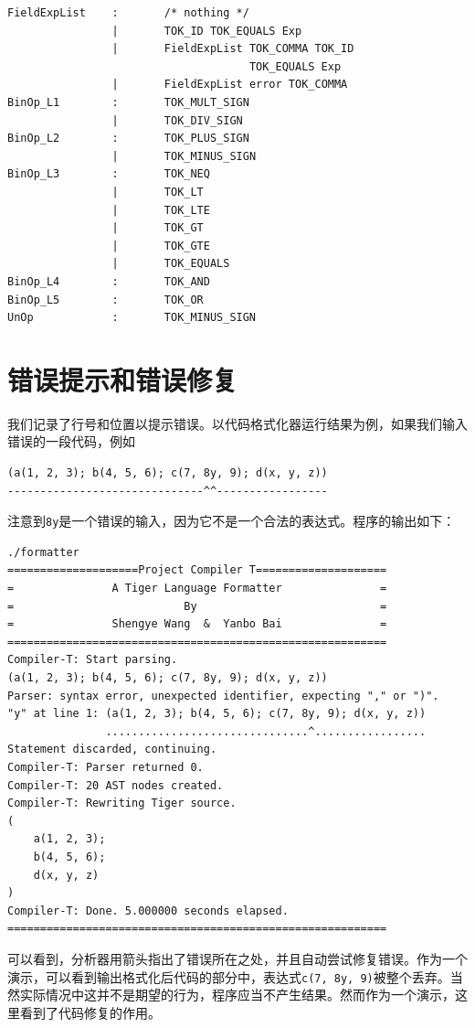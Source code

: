 \begin{verbatim}
FieldExpList    :       /* nothing */
                |       TOK_ID TOK_EQUALS Exp
                |       FieldExpList TOK_COMMA TOK_ID
                                     TOK_EQUALS Exp
                |       FieldExpList error TOK_COMMA
BinOp_L1        :       TOK_MULT_SIGN
                |       TOK_DIV_SIGN
BinOp_L2        :       TOK_PLUS_SIGN
                |       TOK_MINUS_SIGN
BinOp_L3        :       TOK_NEQ
                |       TOK_LT
                |       TOK_LTE
                |       TOK_GT
                |       TOK_GTE
                |       TOK_EQUALS
BinOp_L4        :       TOK_AND
BinOp_L5        :       TOK_OR
UnOp            :       TOK_MINUS_SIGN
\end{verbatim}

\section{错误提示和错误修复}

我们记录了行号和位置以提示错误。以代码格式化器运行结果为例，如果我们输入错误的一段代码，例如
\begin{verbatim}
(a(1, 2, 3); b(4, 5, 6); c(7, 8y, 9); d(x, y, z))
------------------------------^^-----------------
\end{verbatim}
注意到\texttt{8y}是一个错误的输入，因为它不是一个合法的表达式。程序的输出如下：

\begin{verbatim}
./formatter
====================Project Compiler T====================
=               A Tiger Language Formatter               =
=                          By                            =
=               Shengye Wang  &  Yanbo Bai               =
==========================================================
Compiler-T: Start parsing.
(a(1, 2, 3); b(4, 5, 6); c(7, 8y, 9); d(x, y, z))
Parser: syntax error, unexpected identifier, expecting "," or ")".
"y" at line 1: (a(1, 2, 3); b(4, 5, 6); c(7, 8y, 9); d(x, y, z))
               ...............................^.................
Statement discarded, continuing.
Compiler-T: Parser returned 0.
Compiler-T: 20 AST nodes created.
Compiler-T: Rewriting Tiger source.
(
    a(1, 2, 3);
    b(4, 5, 6);
    d(x, y, z)
)
Compiler-T: Done. 5.000000 seconds elapsed.
==========================================================
\end{verbatim}

可以看到，分析器用箭头指出了错误所在之处，并且自动尝试修复错误。作为一个演示，可以看到输出格式化后代码的部分中，表达式\texttt{c(7, 8y, 9)}被整个丢弃。当然实际情况中这并不是期望的行为，程序应当不产生结果。然而作为一个演示，这里看到了代码修复的作用。

